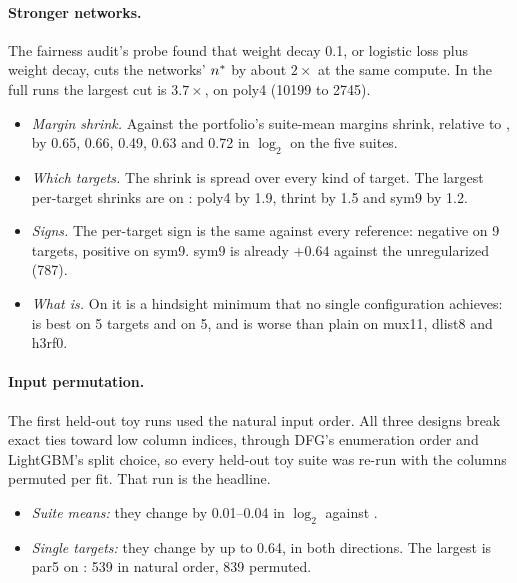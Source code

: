 \paragraph{Stronger networks.} The fairness audit's probe found that weight decay 0.1, or logistic loss plus weight decay, cuts the networks' $n^{*}$ by about $2\times$ at the same compute. In the full runs the largest cut is $3.7\times$, on poly4 (10199 to 2745).
\begin{itemize}
\item \emph{Margin shrink.} Against  the portfolio's suite-mean margins shrink, relative to , by 0.65, 0.66, 0.49, 0.63 and 0.72 in $\log_2$ on the five suites.
\item \emph{Which targets.} The shrink is spread over every kind of target. The largest per-target shrinks are on : poly4 by 1.9, thrint by 1.5 and sym9 by 1.2.
\item \emph{Signs.} The per-target sign is the same against every reference: negative on 9 targets, positive on sym9. sym9 is already $+0.64$ against the unregularized  (787).
\item \emph{What  is.} On  it is a hindsight minimum that no single configuration achieves:  is best on 5 targets and  on 5, and  is worse than plain  on mux11, dlist8 and h3rf0.
\end{itemize}

\paragraph{Input permutation.} The first held-out toy runs used the natural input order. All three designs break exact ties toward low column indices, through DFG's enumeration order and LightGBM's split choice, so every held-out toy suite was re-run with the columns permuted per fit. That run is the headline.
\begin{itemize}
\item \emph{Suite means:} they change by 0.01--0.04 in $\log_2$ against .
\item \emph{Single targets:} they change by up to 0.64, in both directions. The largest is par5 on : 539 in natural order, 839 permuted.
\end{itemize}

